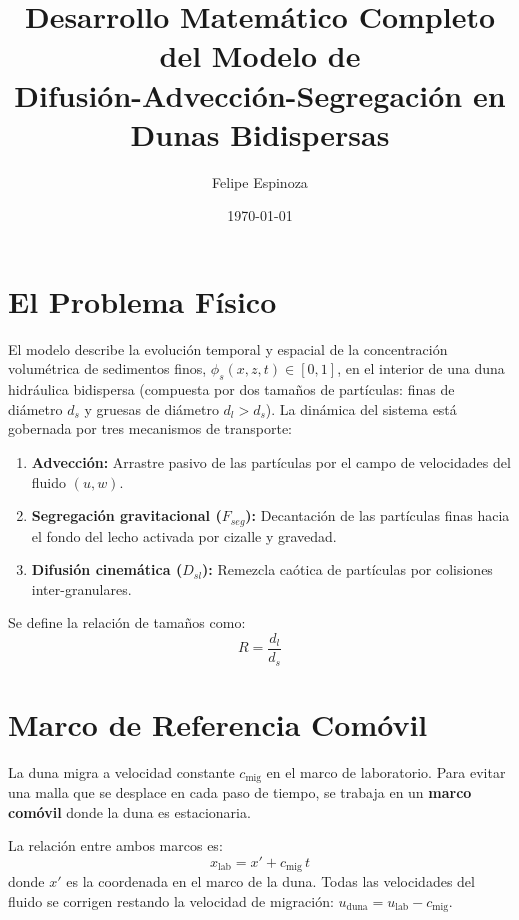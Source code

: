 \documentclass[11pt,a4paper]{article}
\title{\textbf{Desarrollo Matemático Completo del Modelo de\\[4pt] Difusión-Advección-Segregación en Dunas Bidispersas}}
\author{Felipe Espinoza}
\date{\today}
\begin{document}
\maketitle

\tableofcontents
\newpage


\section{El Problema Físico}
El modelo describe la evolución temporal y espacial de la concentración volumétrica de sedimentos finos, $\phi_s(x,z,t) \in [0,1]$, en el interior de una duna hidráulica bidispersa (compuesta por dos tamaños de partículas: finas de diámetro $d_s$ y gruesas de diámetro $d_l > d_s$). La dinámica del sistema está gobernada por tres mecanismos de transporte:
\begin{enumerate}
    \item \textbf{Advección:} Arrastre pasivo de las partículas por el campo de velocidades del fluido $(u, w)$.
    \item \textbf{Segregación gravitacional ($F_{seg}$):} Decantación de las partículas finas hacia el fondo del lecho activada por cizalle y gravedad.
    \item \textbf{Difusión cinemática ($D_{sl}$):} Remezcla caótica de partículas por colisiones inter-granulares.
\end{enumerate}

Se define la relación de tamaños como:
\begin{equation}
    R = \frac{d_l}{d_s}
\end{equation}

\section{Marco de Referencia Comóvil}
La duna migra a velocidad constante $c_{\text{mig}}$ en el marco de laboratorio. Para evitar una malla que se desplace en cada paso de tiempo, se trabaja en un \textbf{marco comóvil} donde la duna es estacionaria.

La relación entre ambos marcos es:
\begin{equation}
    x_{\text{lab}} = x' + c_{\text{mig}} \, t
\end{equation}
donde $x'$ es la coordenada en el marco de la duna. Todas las velocidades del fluido se corrigen restando la velocidad de migración: $u_{\text{duna}} = u_{\text{lab}} - c_{\text{mig}}$.
\end{document}
